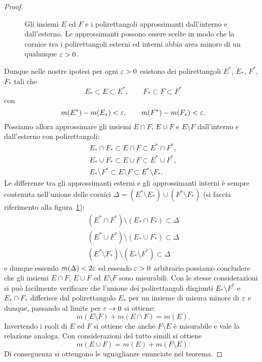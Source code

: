 \begin{proof}
\begin{figure}
  \centering
  \caption{Gli insiemi $E$ ed $F$ e i polirettangoli approssimanti 
  dall'interno e dall'esterno. 
  Le approssimanti possono essere scelte in modo che la cornice tra 
  i polirettangoli esterni ed interni abbia area minore di un 
  qualunque $\varepsilon>0$.}
  \label{fig:PeanoJordan}
\end{figure}
Dunque nelle nostre ipotesi per ogni
$\varepsilon>0$ esistono dei polirettangoli $E^*$, $E_*$, $F^*$, $F_*$
tali che
\[
   E_* \subset E \subset E^*, \qquad
   F_* \subset F \subset F^*
\]
con
\[
  m(E^*)-m(E_*) < \varepsilon,\qquad
  m(F^*)-m(F_*) < \varepsilon.
\]
Possiamo allora approssimare gli insiemi $E\cap F$, $E\cup F$ e $E\setminus F$ dall'interno e dall'esterno con polirettangoli:
\begin{gather*}
  E_*\cap F_* \subset E\cap F \subset E^*\cap F^*, \\
  E_*\cup F_* \subset E\cup F \subset E^* \cup F^*, \\
  E_* \setminus F^* \subset E\setminus F \subset E^*\setminus F_*.
\end{gather*}
Le differenze tra gli approssimanti esterni e gli approssimanti
interni è sempre contenuta nell'unione
delle cornici $\Delta = (E^*\setminus E_*)\cup (F^*\setminus F_*)$
(si faccia riferimento alla figura~\ref{fig:PeanoJordan}):
\begin{align*}
  (E^*\cap F^*) \setminus (E_* \cap F_*) \subset \Delta \\
  (E^*\cup F^*) \setminus (E_*\cup F_*) \subset \Delta \\
  (E^*\setminus F_*) \setminus (E_* \setminus F^*) \subset \Delta
\end{align*}
e dunque essendo $m(\Delta)<2\varepsilon$ ed essendo $\varepsilon>0$ arbitrario
possiamo concludere che gli insiemi $E\cap F$, $E\cup F$ ed $E\setminus F$ sono misurabili.
Con le stesse considerazioni si può facilmente verificare
che l'unione dei polirettangoli disgiunti
$E_*\setminus F^*$ e $E_*\cap F_*$ differisce dal polirettangolo
$E_*$ per un insieme di misura minore di $\varepsilon$ e dunque, passando al limite per $\varepsilon\to 0$ si ottiene:
\[
  m(E\setminus F) + m(E\cap F) = m(E).
\]
Invertendo i ruoli di $E$ ed $F$ si ottiene che anche $F\setminus E$
è misurabile e vale la relazione analoga. Con considerazioni del
tutto simili si ottiene
\[
  m(E\cup F) = m(E) + m(F\setminus E).
\]
Di conseguenza si ottengono le uguaglianze enunciate nel teorema.
\end{proof}

